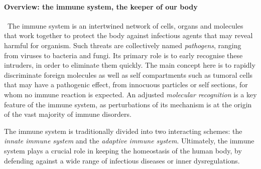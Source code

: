 \paragraph{Overview: the  immune system, the keeper of our body} 
\
The immune system is an intertwined network of cells, organs and molecules that work together to protect the body against infectious agents that may reveal harmful for organism. Such threats are collectively named \emph{pathogens}, ranging from viruses to bacteria and fungi. Its primary role is to early recognise these intruders, in order to eliminate them quickly. The main concept here is to rapidly discriminate foreign molecules as well as self compartments such as tumoral cells that may have a pathogenic effect, from innocuous particles or self sections, for whom no immune reaction is expected. An adjusted \emph{molecular recognition} is a key feature of the immune system, as perturbations of its mechanism is at the origin of the vast majority of immune disorders. 

The immune system is traditionally divided into two interacting schemes: the \emph{innate immune system} and the \emph{adaptive immune system}. 
Ultimately, the immune system plays a crucial role in keeping the homeostasis of the human body, by defending against a wide range of infectious diseases or inner dysregulations. 

